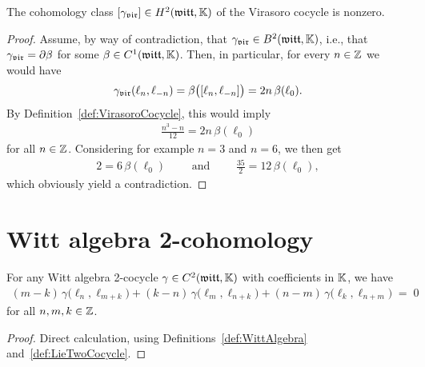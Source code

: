 \begin{lemma}
  \label{lem:VirasoroCocycleNontrivial}
  \leanok
  The cohomology class $[{\gamma}_{\mathfrak{vir}}] \in H^2(\mathfrak{witt},\mathbb{K})$
  of the Virasoro cocycle is nonzero.
\end{lemma}
\begin{proof}
  \leanok
  Assume, by way of contradiction, that ${\gamma}_{\mathfrak{vir}} \in B^2(\mathfrak{witt},\mathbb{K})$,
  i.e., that ${\gamma}_{\mathfrak{vir}} = \partial \beta$ for some $\beta \in C^1(\mathfrak{witt},\mathbb{K})$.
  Then, in particular, for every $n \in \mathbb{Z}$ we would have
  \begin{align*}
    {\gamma}_{\mathfrak{vir}}(\ell_n,\ell_{-n})
      = \beta \big( [\ell_n, \ell_{-n}] \big) = 2 n \, \beta ( \ell_0 ) .
  \end{align*}
  By Definition~\ref{def:VirasoroCocycle}, this would imply
  \begin{align*}
    \frac{n^3-n}{12} = 2 n \, \beta ( \ell_0 )
  \end{align*}
  for all $n \in \mathbb{Z}$. Considering for example $n=3$ and $n=6$, we then get
  \begin{align*}
    2 = 6 \, \beta (\ell_0)
    \qquad \text{ and } \qquad
    \frac{35}{2} = 12 \,  \beta (\ell_0) ,
  \end{align*}
  which obviously yield a contradiction.
\end{proof}

\section{Witt algebra 2-cohomology}

\begin{lemma}
  \label{lem:WittTwoCocycleEquation}
  \leanok
  For any Witt algebra 2-cocycle $\gamma \in C^2(\mathfrak{witt},\mathbb{K})$ with coefficients
  in $\mathbb{K}$, we have
  \begin{align*}
       (m-k) \, \gamma \big( \ell_n , \ell_{m+k} \big)
     + (k-n) \, \gamma \big( \ell_{m} , \ell_{n+k} \big)
     + (n-m) \, \gamma \big( \ell_k , \ell_{n+m} \big)
     \; = \; 0
  \end{align*}
  for all $n,m,k \in \mathbb{Z}$.
\end{lemma}
\begin{proof}
  \leanok
  Direct calculation, using Definitions~\ref{def:WittAlgebra}
  and~\ref{def:LieTwoCocycle}.
\end{proof}

